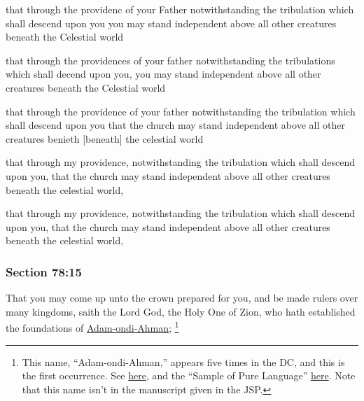 		\begin{framed}
		\scriptsize
			\begin{compactdesc}
				\item[JSP] that through the providenc of your Father notwithstanding the tribulation which shall descend upon you you may stand independent above all other creatures beneath the Celestial world
				\item[RB1] that through the providences of your father notwithstanding the tribulations which shall decend upon you, you may stand independent above all other creatures beneath the Celestial world
				\item[RB2] that through the providence of your father notwithstanding the tribulation which shall descend upon you that the church may stand independent above all other creatures benieth [beneath] the celestial world
				\item[DC 1835] that through my providence, notwithstanding the tribulation which shall descend upon you, that the church may stand independent above all other creatures beneath the celestial world,
				\item[DC 1844] that through my providence, notwithstanding the tribulation which shall descend upon you, that the church may stand independent above all other creatures beneath the celestial world,
			\end{compactdesc}
		\end{framed}

	\subsubsection{Section 78:15} %
		\label{DC78-15}

		That you may come up unto the crown prepared for you, and be made rulers over many kingdoms, saith the Lord God, the Holy One of Zion, who hath established the foundations of \hyperref[ADAM-ONDI-AHMAN]{Adam-ondi-Ahman};%
			\footnote{%
				This name, ``Adam-ondi-Ahman,'' appears five times in the DC, and this is the first occurrence. See \hyperref[ADAM-ONDI-AHMAN]{here}, and the ``Sample of Pure Language'' \hyperref[EMS-1832-JS-CIR-4-MAR-1832-LANG]{here}. Note that this name isn't in the manuscript given in the JSP.
				}

